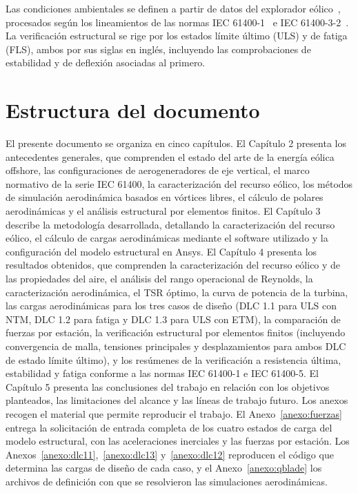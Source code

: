 Las condiciones ambientales se definen a partir de datos del explorador eólico~\parencite{ExploradorEolico2018}, procesados según los lineamientos de las normas IEC 61400-1~\parencite*{IEC61400-1} e IEC 61400-3-2~\parencite*{IEC61400-3-2}. La verificación estructural se rige por los estados límite último (ULS) y de fatiga (FLS), ambos por sus siglas en inglés, incluyendo las comprobaciones de estabilidad y de deflexión asociadas al primero.

\section{Estructura del documento}

El presente documento se organiza en cinco capítulos. El Capítulo 2 presenta los antecedentes generales, que comprenden el estado del arte de la energía eólica offshore, las configuraciones de aerogeneradores de eje vertical, el marco normativo de la serie IEC 61400, la caracterización del recurso eólico, los métodos de simulación aerodinámica basados en vórtices libres, el cálculo de polares aerodinámicas y el análisis estructural por elementos finitos. El Capítulo 3 describe la metodología desarrollada, detallando la caracterización del recurso eólico, el cálculo de cargas aerodinámicas mediante el software utilizado y la configuración del modelo estructural en Ansys. El Capítulo 4 presenta los resultados obtenidos, que comprenden la caracterización del recurso eólico y de las propiedades del aire, el análisis del rango operacional de Reynolds, la caracterización aerodinámica, el TSR óptimo, la curva de potencia de la turbina, las cargas aerodinámicas para los tres casos de diseño (DLC 1.1 para ULS con NTM, DLC 1.2 para fatiga y DLC 1.3 para ULS con ETM), la comparación de fuerzas por estación, la verificación estructural por elementos finitos (incluyendo convergencia de malla, tensiones principales y desplazamientos para ambos DLC de estado límite último), y los resúmenes de la verificación a resistencia última, estabilidad y fatiga conforme a las normas IEC 61400-1 e IEC 61400-5. El Capítulo 5 presenta las conclusiones del trabajo en relación con los objetivos planteados, las limitaciones del alcance y las líneas de trabajo futuro. Los anexos recogen el material que permite reproducir el trabajo. El Anexo~\ref{anexo:fuerzas} entrega la solicitación de entrada completa de los cuatro estados de carga del modelo estructural, con las aceleraciones inerciales y las fuerzas por estación. Los Anexos~\ref{anexo:dlc11},~\ref{anexo:dlc13} y~\ref{anexo:dlc12} reproducen el código que determina las cargas de diseño de cada caso, y el Anexo~\ref{anexo:qblade} los archivos de definición con que se resolvieron las simulaciones aerodinámicas.